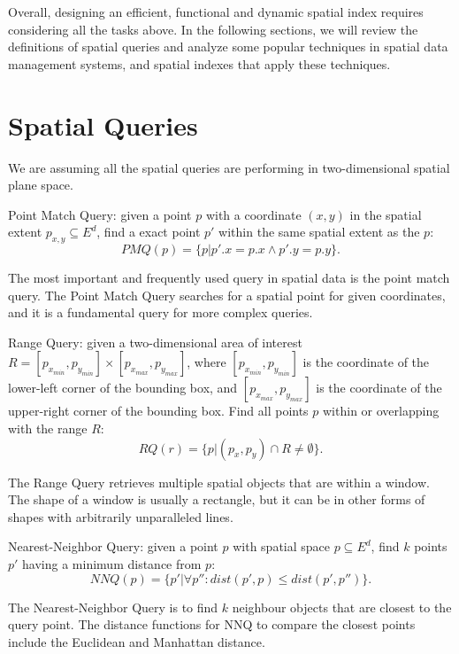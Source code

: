 Overall, designing an efficient, functional and dynamic spatial index requires considering all the tasks above. In the following sections, we will review the definitions of spatial queries and analyze some popular techniques in spatial data management systems, and spatial indexes that apply these techniques. 




\section{Spatial Queries}
We are assuming all the spatial queries are performing in two-dimensional spatial plane space. 

\begin{query}\label{def:pmq}
Point Match Query: given a point $p$ with a coordinate $(x, y)$ in the spatial extent ${p_{x, y}} \subseteq {E^d}$, find a exact point $p'$ within the same spatial extent as the $p$:
\[PMQ(p) = \{p|p'.x = p.x \land p'.y = p.y\}.\]
\end{query}

The most important and frequently used query in spatial data is the point match query. The Point Match Query searches for a spatial point for given coordinates, and it is a fundamental query for more complex queries.

\begin{query}\label{def:rq}
Range Query: given a two-dimensional area of interest $R = [p_{x_{min}}, p_{y_{min}}] \times [p_{x_{max}}, p_{y_{max}}]$, where $[p_{x_{min}}, p_{y_{min}}]$ is the coordinate of the lower-left corner of the bounding box, and $[p_{x_{max}}, p_{y_{max}}]$ is the coordinate of the upper-right corner of the bounding box. Find all points $p$ within or overlapping with the range $R$:
\[RQ(r) = \{p|(p_x, p_y) \cap R \neq \emptyset\}.\]
\end{query}

The Range Query retrieves multiple spatial objects that are within a window. The shape of a window is usually a rectangle, but it can be in other forms of shapes with arbitrarily unparalleled lines.

\begin{query}\label{def:nnq}
Nearest-Neighbor Query: given a point $p$ with spatial space $p\subseteq{E^d}$, find $k$ points $p'$ having a minimum distance from $p$:
\[NNQ(p) = \{p'|\forall p'':dist(p', p) \leq dist(p', p'')\}.\]
\end{query}

The Nearest-Neighbor Query is to find $k$ neighbour objects that are closest to the query point.  The distance functions for NNQ to compare the closest points include the Euclidean and Manhattan distance. 



